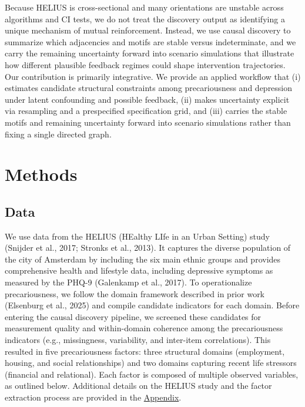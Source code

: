\documentclass[
]{article}
\begin{document}
Because HELIUS is cross-sectional and many orientations are unstable
across algorithms and CI tests, we do not treat the discovery output as
identifying a unique mechanism of mutual reinforcement. Instead, we use
causal discovery to summarize which adjacencies and motifs are stable
versus indeterminate, and we carry the remaining uncertainty forward
into scenario simulations that illustrate how different plausible
feedback regimes could shape intervention trajectories. Our contribution
is primarily integrative. We provide an applied workflow that (i)
estimates candidate structural constraints among precariousness and
depression under latent confounding and possible feedback, (ii) makes
uncertainty explicit via resampling and a prespecified specification
grid, and (iii) carries the stable motifs and remaining uncertainty
forward into scenario simulations rather than fixing a single directed
graph.

\section{Methods}\label{methods}

\subsection{Data}\label{data}

We use data from the HELIUS (HEalthy LIfe in an Urban Setting) study
(Snijder et al., 2017; Stronks et al., 2013). It captures the diverse
population of the city of Amsterdam by including the six main ethnic
groups and provides comprehensive health and lifestyle data, including
depressive symptoms as measured by the PHQ-9 (Galenkamp et al., 2017).
To operationalize precariousness, we follow the domain framework
described in prior work (Elsenburg et al., 2025) and compile candidate
indicators for each domain. Before entering the causal discovery
pipeline, we screened these candidates for measurement quality and
within-domain coherence among the precariousness indicators (e.g.,
missingness, variability, and inter-item correlations). This resulted in
five precariousness factors: three structural domains (employment,
housing, and social relationships) and two domains capturing recent life
stressors (financial and relational). Each factor is composed of
multiple observed variables, as outlined below. Additional details on
the HELIUS study and the factor extraction process are provided in the
\hyperref[sec-appendix]{Appendix}.
\end{document}

